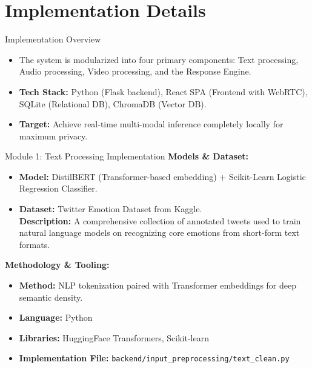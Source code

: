 \documentclass[11pt]{beamer}
\begin{document}
\section{Implementation Details}

\begin{frame}{Implementation Overview}
    \justifying
    \begin{itemize}
        \item The system is modularized into four primary components: Text processing, Audio processing, Video processing, and the Response Engine.
        \item \textbf{Tech Stack:} Python (Flask backend), React SPA (Frontend with WebRTC), SQLite (Relational DB), ChromaDB (Vector DB).
        \item \textbf{Target:} Achieve real-time multi-modal inference completely locally for maximum privacy.
    \end{itemize}
\end{frame}

\begin{frame}{Module 1: Text Processing Implementation}
    \justifying
    \textbf{Models \& Dataset:}
    \begin{itemize}
        \item \textbf{Model:} DistilBERT (Transformer-based embedding) + Scikit-Learn Logistic Regression Classifier.
        \item \textbf{Dataset:} Twitter Emotion Dataset from Kaggle. \\ \textbf{Description:} A comprehensive collection of annotated tweets used to train natural language models on recognizing core emotions from short-form text formats.
    \end{itemize}
    \vspace{0.2cm}
    \textbf{Methodology \& Tooling:}
    \begin{itemize}
        \item \textbf{Method:} NLP tokenization paired with Transformer embeddings for deep semantic density.
        \item \textbf{Language:} Python
        \item \textbf{Libraries:} HuggingFace Transformers, Scikit-learn
        \item \textbf{Implementation File:} \texttt{backend/input\_preprocessing/text\_clean.py}
    \end{itemize}
\end{frame}
\end{document}
